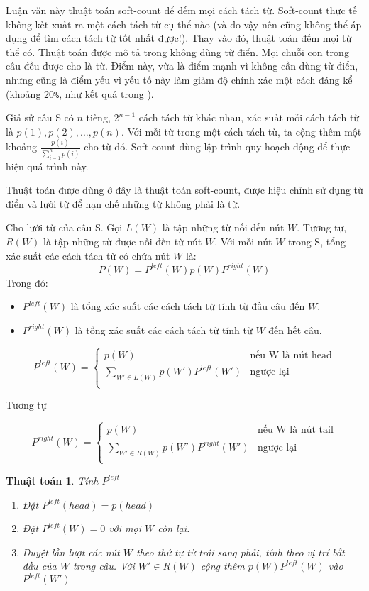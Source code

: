 \documentclass[a4paper]{book} %
\newtheorem{algo}{Thuật toán}
\begin{document}
Luận văn này thuật toán soft-count để đếm mọi cách tách từ. Soft-count
thực tế không kết xuất ra một cách tách từ cụ thể nào (và do vậy nên
cũng không thể áp dụng để tìm cách tách từ tốt nhất được!). Thay vào
đó, thuật toán đếm mọi từ thể có. Thuật toán được mô tả trong
\cite{softcount} không dùng từ điển. Mọi chuỗi con trong câu đều được
cho là từ. Điểm này, vừa là điểm mạnh vì không cần dùng từ
điển, nhưng cũng là điểm yếu vì yếu tố này làm giảm độ chính xác một
cách đáng kể (khoảng 20\verb#%#, như kết quả trong \cite{softcount}).

Giả sử câu S có $n$ tiếng, $2^{n-1}$ cách tách từ khác nhau, xác suất
mỗi cách tách từ là $p(1),p(2),\ldots,p(n)$.
Với mỗi từ trong một cách tách từ, ta cộng thêm một khoảng
$\displaystyle\frac{p(i)}{\sum_{i=1}^n{p(i)}}$ cho từ đó. Soft-count dùng
lập trình quy hoạch động để thực hiện quá trình này.

Thuật toán được dùng ở đây là thuật toán soft-count, được hiệu chỉnh
sử dụng từ điển và lưới từ để hạn chế những từ không phải là từ.

Cho lưới từ của câu S. Gọi $L(W)$ là tập những từ nối đến nút
$W$. Tương tự, $R(W)$ là tập những từ được nối đến từ nút $W$.
Với mỗi nút $W$ trong S, tổng xác suất các cách tách từ có chứa nút
$W$ là:
$$P(W)=P^{left}(W)p(W)P^{right}(W)$$
Trong đó:
\begin{itemize}
\item $P^{left}(W)$ là tổng xác suất các cách tách từ tính từ đầu câu
  đến $W$.
\item $P^{right}(W)$ là tổng xác suất các cách tách từ tính từ $W$ đến
  hết câu.
\end{itemize}

$$
P^{left}(W) = \left\{
    \begin{array}{ll}
      p(W)&\text{nếu W là nút head}\\
      \displaystyle\sum_{W' \in L(W)}p(W')P^{left}(W')&\text{ngược lại}\\
    \end{array}
  \right.
$$

Tương tự

$$
P^{right}(W) = \left\{
    \begin{array}{ll}
      p(W)&\text{nếu W là nút tail}\\
      \displaystyle\sum_{W' \in R(W)}p(W')P^{right}(W')&\text{ngược lại}\\
    \end{array}
  \right.
$$

\begin{algo}Tính $P^{left}$

\begin{enumerate}
\item Đặt $P^{left}(head) = p(head)$
\item Đặt $P^{left}(W) = 0$ với mọi $W$ còn lại.
\item Duyệt lần lượt các nút $W$ theo thứ tự từ trái sang phải, tính
  theo vị trí bắt đầu của $W$ trong câu. Với $W' \in R(W)$
  cộng thêm $p(W)P^{left}(W)$ vào $P^{left}(W')$
\end{enumerate}
\end{algo}
\end{document}
